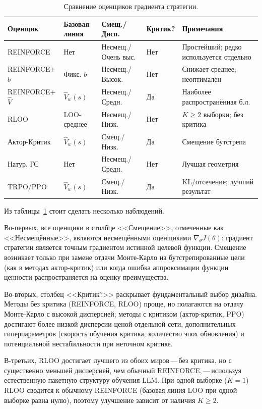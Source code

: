 \begin{table}[ht]
\centering
\caption{Сравнение оценщиков градиента стратегии.}
\label{tab:pg-comparison-ch8}
\small
\begin{tabular}{@{}llllp{3.2cm}@{}}
\toprule
\textbf{Оценщик} & \textbf{Базовая линия} & \textbf{Смещ./Дисп.} & \textbf{Критик?} & \textbf{Примечания} \\
\midrule
REINFORCE & Нет & Несмещ./Очень выс. & Нет & Простейший; редко используется отдельно \\
\addlinespace
REINFORCE+$b$ & Фикс. $b$ & Несмещ./Высок. & Нет & Снижает среднее; неоптимален \\
\addlinespace
REINFORCE+$\hat V$ & $\hat V_w(s)$ & Несмещ./Средн. & Да & Наиболее распространённая б.л. \\
\addlinespace
RLOO & LOO-среднее & Несмещ./Низк. & Нет & $K\!\geq\!2$ выборки; без критика \\
\addlinespace
Актор-Критик & $\hat V_w(s)$ & Смещ./Низк. & Да & Смещение бутстрепа \\
\addlinespace
Натур. ГС & Нет & Несмещ./Средн. & Нет & Лучшая геометрия \\
\addlinespace
TRPO/PPO & $\hat V_w(s)$ & Смещ./Низк. & Да & KL/отсечение; лучший результат \\
\bottomrule
\end{tabular}
\end{table}

Из таблицы~\ref{tab:pg-comparison-ch8} стоит сделать несколько наблюдений.

Во-первых, все оценщики в столбце <<Смещение>>, отмеченные как <<Несмещённые>>, являются несмещёнными оценщиками $\nabla_\theta J(\theta)$: градиент стратегии является точным градиентом истинной целевой функции. Смещение возникает только при замене отдачи Монте-Карло на бутстрепированные цели (как в методах актор-критик) или когда ошибка аппроксимации функции ценности распространяется на оценку преимущества.

Во-вторых, столбец <<Критик?>> раскрывает фундаментальный выбор дизайна. Методы без критика (REINFORCE, RLOO) проще, но полагаются на отдачу Монте-Карло с высокой дисперсией; методы с критиком (актор-критик, PPO) достигают более низкой дисперсии ценой отдельной сети, дополнительных гиперпараметров (скорость обучения критика, количество эпох обновления) и потенциальной нестабильности при неточном критике.

В-третьих, RLOO достигает лучшего из обоих миров\,---\,без критика, но с существенно меньшей дисперсией, чем обычный REINFORCE,\,---\,используя естественную пакетную структуру обучения LLM. При одной выборке ($K=1$) RLOO сводится к обычному REINFORCE (базовая линия LOO при одной выборке равна нулю), поэтому улучшение зависит от наличия $K \geq 2$.

